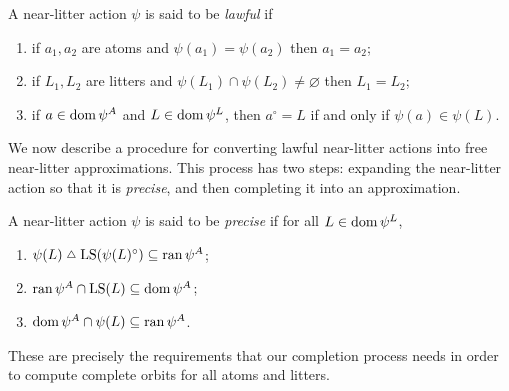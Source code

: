 \begin{definition}
    A near-litter action \( \psi \) is said to be \emph{lawful} if
    \begin{enumerate}
        \item if \( a_1, a_2 \) are atoms and \( \psi(a_1) = \psi(a_2) \) then \( a_1 = a_2 \);
        \item if \( L_1, L_2 \) are litters and \( \psi(L_1) \cap \psi(L_2) \neq \varnothing \) then \( L_1 = L_2 \);
        \item if \( a \in \operatorname{dom} \psi^A \) and \( L \in \operatorname{dom} \psi^L \), then \( a^\circ = L \) if and only if \( \psi(a) \in \psi(L) \).
    \end{enumerate}
\end{definition}

We now describe a procedure for converting lawful near-litter actions into free near-litter approximations.
This process has two steps: expanding the near-litter action so that it is \emph{precise}, and then completing it into an approximation.

\begin{definition}
    \label{def:precise}
    A near-litter action \( \psi \) is said to be \emph{precise} if for all \( L \in \operatorname{dom} \psi^L \),
    \begin{enumerate}
        \item \( \psi(L) \symmdiff \LS(\psi(L)^\circ) \subseteq \ran \psi^A \);
        \item \( \operatorname{ran} \psi^A \cap \operatorname{LS}(L) \subseteq \operatorname{dom} \psi^A \);
        \item \( \operatorname{dom} \psi^A \cap \psi(L) \subseteq \operatorname{ran} \psi^A \).
    \end{enumerate}
\end{definition}

These are precisely the requirements that our completion process needs in order to compute complete orbits for all atoms and litters.

